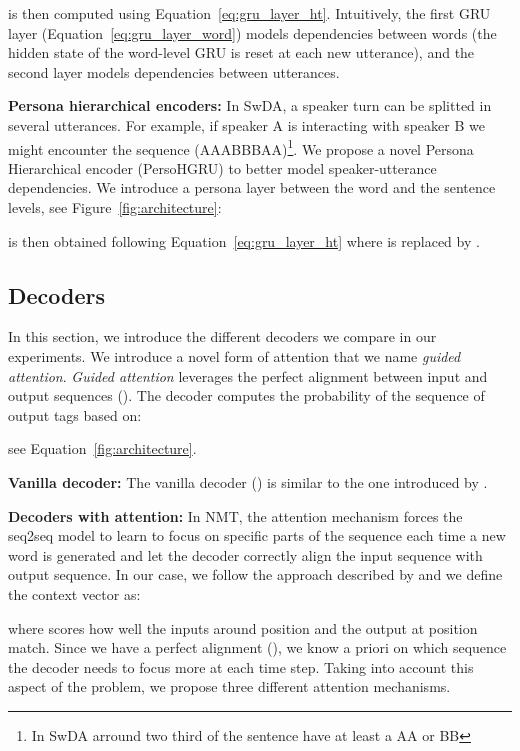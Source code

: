 \documentclass[letterpaper]{article} \usepackage{aaai20}  \usepackage{times}  \usepackage{helvet} \usepackage{courier}  \usepackage[hyphens]{url}  \usepackage{graphicx} \urlstyle{rm} \def\UrlFont{\rm}  \usepackage{graphicx}  \frenchspacing  \setlength{\pdfpagewidth}{8.5in}  \setlength{\pdfpageheight}{11in}
\newcommand{\citet}[1]{\citeauthor{#1} \shortcite{#1}}
\begin{document}
 is then computed using Equation~\ref{eq:gru_layer_ht}. Intuitively, the first GRU layer (Equation~\ref{eq:gru_layer_word}) models dependencies between words (the hidden state of the word-level GRU is reset at each new utterance), and the second layer models dependencies between utterances.

\noindent\textbf{Persona hierarchical encoders:} In SwDA, a speaker turn can be splitted in several utterances. For example, if speaker A is interacting with speaker B we might encounter the sequence (AAABBBAA)\footnote{In SwDA arround two third of the sentence have at least a AA or BB}. We propose a novel Persona Hierarchical encoder (PersoHGRU) to better model speaker-utterance dependencies. We introduce a persona layer between the word and the sentence levels, see Figure~\ref{fig:architecture}:

 is then obtained following Equation~\ref{eq:gru_layer_ht} where  is replaced by .

\subsection{Decoders}
In this section, we introduce the different decoders we compare in our experiments. We introduce a novel form of attention that we name \textit{guided attention}. \textit{Guided attention} leverages the perfect alignment between input and output sequences (). The decoder computes the probability of the sequence of output tags based on:
\begin{small}

\end{small}
see Equation~\ref{fig:architecture}.

\indent\textbf{Vanilla decoder:} The vanilla decoder () is similar to the one introduced by \citet{seq2seq}.

\indent\textbf{Decoders with attention:} In NMT, the attention mechanism forces the seq2seq model to learn to focus on specific parts of the sequence each time a new word is generated and let the decoder correctly align the input sequence with output sequence. In our case, we follow the approach described by \citet{badau} and we define the context vector as:

where   scores how well the inputs around position  and the output at position  match. Since we have a perfect alignment (), we know a priori on which sequence the decoder needs to focus more at each time step. Taking into account this aspect of the problem, we propose three different attention mechanisms.
\end{document}
